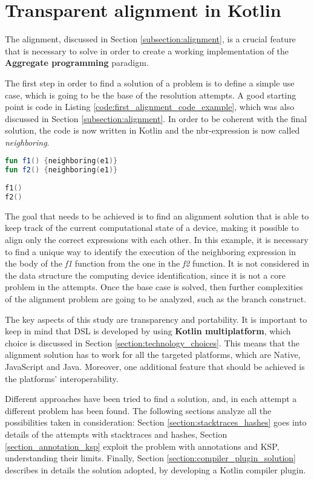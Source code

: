 \chapter{Transparent alignment in Kotlin}\label{chapter:alignment}
The alignment, discussed in Section \ref{subsection:alignment}, is a crucial feature that is necessary to solve in order to create a working implementation of the \textbf{Aggregate programming} paradigm. 

The first step in order to find a solution of a problem is to define a simple use case, which is going to be the base of the resolution attempts. A good starting point is code in Listing \ref{code:first_alignment_code_example}, which was also discussed in Section \ref{subsection:alignment}. In order to be coherent with the final solution, the code is now written in Kotlin and the nbr-expression is now called \textit{neighboring}.
\begin{lstlisting}[caption={Starting point code to resolve the alignment problem}, captionpos=b, language=Kotlin, label={code:first_alignment_code_example}]
fun f1() {neighboring(e1)}
fun f2() {neighboring(e1)}
        
f1()
f2()
\end{lstlisting}
The goal that needs to be achieved is to find an alignment solution that is able to keep track of the current computational state of a device, making it possible to align only the correct expressions with each other. In this example, it is necessary to find a unique way to identify the execution of the neighboring expression in the body of the \textit{f1} function from the one in the \textit{f2} function.\newline
It is not considered in the data structure the computing device identification, since it is not a core problem in the attempts. Once the base case is solved, then further complexities of the alignment problem are going to be analyzed, such as the branch construct.

The key aspects of this study are transparency and portability. It is important to keep in mind that DSL is developed by using \textbf{Kotlin multiplatform}, which choice is discussed in Section \ref{section:technology_choices}. This means that the alignment solution has to work for all the targeted platforms, which are Native, JavaScript and Java. Moreover, one additional feature that should be achieved is the platforms' interoperability.

Different approaches have been tried to find a solution, and, in each attempt a different problem has been found. The following sections analyze all the possibilities taken in consideration: Section \ref{section:stacktraces_hashes} goes into details of the attempts with stacktraces and hashes, Section \ref{section_annotation_ksp} exploit the problem with annotations and KSP, understanding their limits. Finally, Section \ref{section:compiler_plugin_solution} describes in details the solution adopted, by developing a Kotlin compiler plugin.

